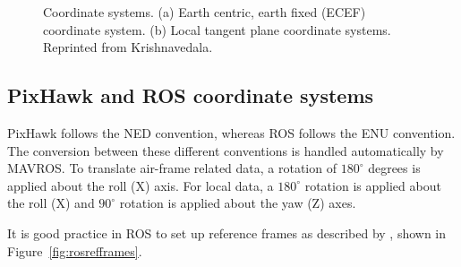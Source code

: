 \begin{figure}%
	\centering
	\caption[ECEF coordinate system]{\small Coordinate systems. (a) Earth centric, earth fixed (ECEF) coordinate system. (b) Local tangent plane coordinate systems. Reprinted from Krishnavedala. 
	}%
	\label{fig:coordinatesystem}%
\end{figure}

\subsection{PixHawk and ROS coordinate systems}

PixHawk follows the NED convention, whereas ROS follows the ENU convention. The conversion between these different conventions is handled automatically by MAVROS. To translate air-frame related data, a rotation of $180^{\circ}$ degrees is applied about the roll (X) axis. For local data, a $180^{\circ}$ rotation is applied about the roll (X) and $90^{\circ}$ rotation is applied about the yaw (Z) axes.

It is good practice in ROS to set up reference frames as described by , shown in Figure~\ref{fig:rosrefframes}.

